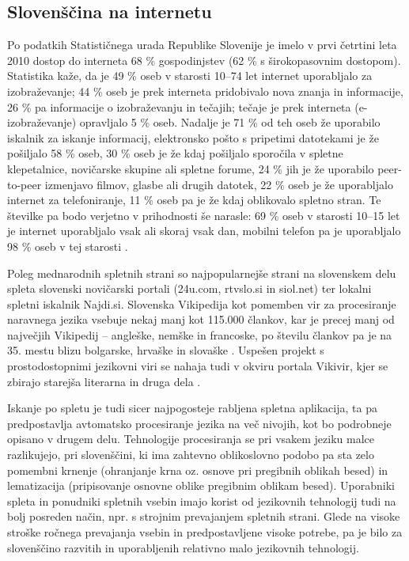 \begin{multicols}{2}
\subsection{Slovenščina na internetu}

Po podatkih Statističnega urada Republike Slovenije je imelo v prvi četrtini leta 2010 dostop do interneta 68 \% gospodinjstev (62 \% s širokopasovnim dostopom). Statistika kaže, da je 49 \% oseb v starosti 10–74 let internet uporabljalo za izobraževanje; 44 \% oseb je prek interneta pridobivalo nova znanja in informacije, 26 \% pa informacije o izobraževanju in tečajih; tečaje je prek interneta (e-izobraževanje) opravljalo 5 \% oseb. Nadalje je 71 \% od teh oseb že uporabilo iskalnik za iskanje informacij, elektronsko pošto s pripetimi datotekami je že pošiljalo 58 \% oseb, 30 \% oseb je že kdaj pošiljalo sporočila v spletne klepetalnice, novičarske skupine ali spletne forume, 24 \% jih je že uporabilo peer-to-peer izmenjavo filmov, glasbe ali drugih datotek, 22 \% oseb je že uporabljalo internet za telefoniranje, 11 \% oseb pa je že kdaj oblikovalo spletno stran. Te številke pa bodo verjetno v prihodnosti še narasle: 69 \% oseb v starosti 10–15 let je internet uporab\-ljalo vsak ali skoraj vsak dan, mobilni telefon pa je uporabljalo 98 \% oseb v tej starosti \cite{SURS3}. 


Poleg mednarodnih spletnih strani so najpopularnejše strani na slovenskem delu spleta slovenski novičarski portali (24u.com, rtvslo.si in siol.net) ter lokalni spletni iskalnik Najdi.si. Slovenska Vikipedija kot pomemben vir za procesiranje na\-ravnega jezika vsebuje nekaj manj kot 115.000 člankov, kar je precej manj od največjih Vikipedij – angleške, nemške in francoske, po številu člankov pa je na 35. mestu blizu bolgarske, hrvaške in slovaške \cite{Wiki1}.  Uspešen projekt s prostodostopnimi jezikovni viri se nahaja tudi v okviru portala Vikivir, kjer se zbirajo starejša literarna in druga dela \cite{Wiki2}.  

Iskanje po spletu je tudi sicer najpogosteje rabljena spletna aplikacija, ta pa predpostavlja avtomatsko procesiranje jezika na več nivojih, kot bo podrobneje opisano v drugem delu. Tehnologije procesiranja se pri vsakem jeziku malce razlikujejo, pri slovenščini, ki ima zahtevno oblikoslovno podobo pa sta zelo pomembni krnenje (ohranjanje krna oz. osnove pri pregibnih oblikah besed) in lematizacija (pripisovanje osnovne oblike pregibnim oblikam besed). Uporabniki spleta in ponudniki spletnih vsebin imajo korist od jezikovnih tehnologij tudi na bolj posreden način, npr. s strojnim prevajanjem spletnih strani. Glede na visoke stroške ročnega prevajanja vsebin in predpostavljene visoke potrebe, pa je bilo za slovenščino razvitih in uporabljenih relativno malo jezikovnih tehnologij. 


\end{multicols}
